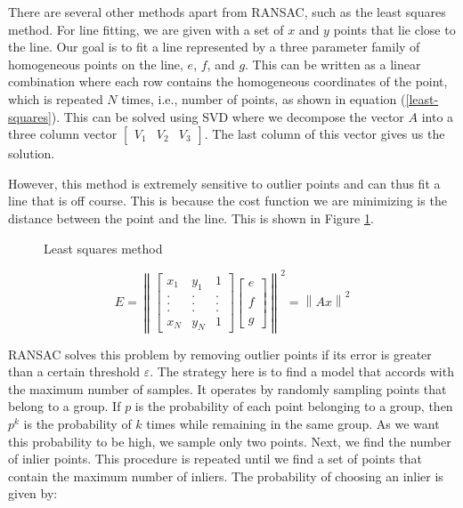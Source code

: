 \documentclass[11pt, a4paper, openany]{article}
\begin{document}
There are several other methods apart from RANSAC, such as the least squares method. For line fitting, we are given with a set of $x$ and $y$ points that lie close to the line. Our goal is to fit a line represented by a three parameter family of homogeneous points on the line, $e$, $f$, and $g$. This can be written as a linear combination where each row contains the homogeneous coordinates of the point, which is repeated $N$ times, i.e., number of points, as shown in equation (\ref{least-squares}). This can be solved using SVD where we decompose the vector $A$ into a three column vector $\begin{bmatrix} V_{1} & V_{2} & V_{3} \end{bmatrix}$. The last column of this vector gives us the solution.

However, this method is extremely sensitive to outlier points and can thus fit a line that is off course. This is because the cost function we are minimizing is the distance between the point and the line. This is shown in Figure \ref{fig:least-squares}.

\begin{figure}[!ht]%
    \centering
    \qquad
    \caption{Least squares method}%
    \label{fig:least-squares}%
\end{figure}

\begin{equation}\label{least-squares}
E = \left \| \begin{bmatrix}
 x_{1}  & y_{1} & 1 \\
 .  & . & . \\
 .  & . & . \\
 .  & . & . \\
 x_{N}  & y_{N} & 1
\end{bmatrix} \begin{bmatrix}
e\\ \\
f\\ \\
g
\end{bmatrix} \right \|^{2} = \left \| Ax \right \|^{2}
\end{equation}

RANSAC solves this problem by removing outlier points if its error is greater than a certain threshold $\varepsilon$. The strategy here is to find a model that accords with the maximum number of samples. It operates by randomly sampling points that belong to a group. If $p$ is the probability of each point belonging to a group, then $p^{k}$ is the probability of $k$ times while remaining in the same group. As we want this probability to be high, we sample only two points. Next, we find the number of inlier points. This procedure is repeated until we find a set of points that contain the maximum number of inliers. The probability of choosing an inlier is given by:
\end{document}
